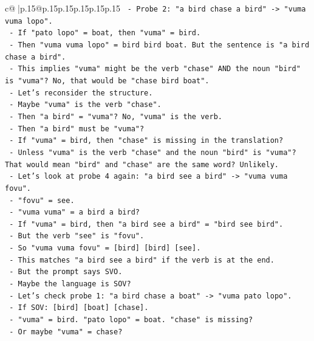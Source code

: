 \documentclass{article}
\begin{document}
{\begin{supertabular}{c@{$\;$}|p{.15\linewidth}@{}p{.15\linewidth}p{.15\linewidth}p{.15\linewidth}p{.15\linewidth}p{.15\linewidth}}
{{{\texttt{      {-} Probe 2: "a bird chase a bird" {-}> "vuma vuma lopo".} \\
\texttt{      {-} If "pato lopo" = boat, then "vuma" = bird.} \\
\texttt{      {-} Then "vuma vuma lopo" = bird bird boat. But the sentence is "a bird chase a bird".} \\
\texttt{      {-} This implies "vuma" might be the verb "chase" AND the noun "bird" is "vuma"? No, that would be "chase bird boat".} \\
\texttt{      {-} Let's reconsider the structure.} \\
\texttt{      {-} Maybe "vuma" is the verb "chase".} \\
\texttt{      {-} Then "a bird" = "vuma"? No, "vuma" is the verb.} \\
\texttt{      {-} Then "a bird" must be "vuma"?} \\
\texttt{      {-} If "vuma" = bird, then "chase" is missing in the translation?} \\
\texttt{      {-} Unless "vuma" is the verb "chase" and the noun "bird" is "vuma"? That would mean "bird" and "chase" are the same word? Unlikely.} \\
\texttt{      {-} Let's look at probe 4 again: "a bird see a bird" {-}> "vuma vuma fovu".} \\
\texttt{        {-} "fovu" = see.} \\
\texttt{        {-} "vuma vuma" = a bird a bird?} \\
\texttt{        {-} If "vuma" = bird, then "a bird see a bird" = "bird see bird".} \\
\texttt{        {-} But the verb "see" is "fovu".} \\
\texttt{        {-} So "vuma vuma fovu" = {[}bird{]} {[}bird{]} {[}see{]}.} \\
\texttt{        {-} This matches "a bird see a bird" if the verb is at the end.} \\
\texttt{        {-} But the prompt says SVO.} \\
\texttt{        {-} Maybe the language is SOV?} \\
\texttt{        {-} Let's check probe 1: "a bird chase a boat" {-}> "vuma pato lopo".} \\
\texttt{          {-} If SOV: {[}bird{]} {[}boat{]} {[}chase{]}.} \\
\texttt{          {-} "vuma" = bird. "pato lopo" = boat. "chase" is missing?} \\
\texttt{          {-} Or maybe "vuma" = chase?} \\
}}}
\end{supertabular}}
\end{document}
